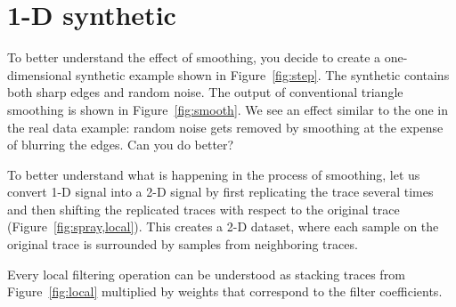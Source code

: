 \lstset{language=python,numbers=left,numberstyle=\tiny,showstringspaces=false}


\section{1-D synthetic}


To better understand the effect of smoothing, you decide to create a
one-dimensional synthetic example shown in Figure~\ref{fig:step}. The
synthetic contains both sharp edges and random noise.  The output of
conventional triangle smoothing is shown in
Figure~\ref{fig:smooth}. We see an effect similar to the one in the
real data example: random noise gets removed by smoothing at the
expense of blurring the edges. Can you do better?


To better understand what is happening in the process of smoothing,
let us convert 1-D signal into a 2-D signal by first replicating the
trace several times and then shifting the replicated traces with
respect to the original trace (Figure~\ref{fig:spray,local}). This
creates a 2-D dataset, where each sample on the original trace is
surrounded by samples from neighboring traces.

Every local filtering operation can be understood as stacking traces
from Figure~\ref{fig:local} multiplied by weights that correspond to
the filter coefficients.


